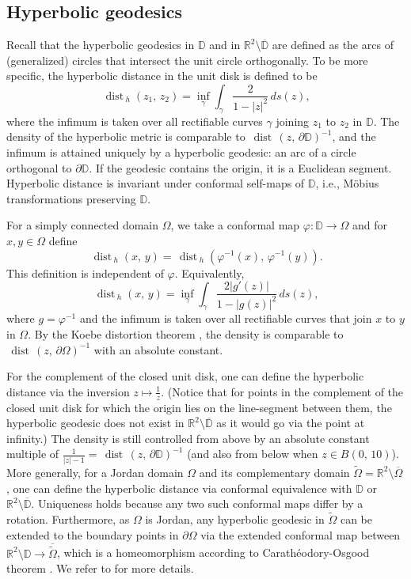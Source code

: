 \documentclass[reqno,11pt]{amsart}
\def\dist{{\mathop\mathrm{\,dist\,}}}
\def\wz{\widetilde}
\numberwithin{equation}{section}
\theoremstyle{remark}
\begin{document}
\subsection{Hyperbolic geodesics}

Recall that the hyperbolic geodesics in $\mathbb D$ and in
$\mathbb R^2\setminus \overline{\mathbb D}$ are defined as the arcs of 
(generalized) circles that intersect the 
unit circle orthogonally. 
  To be more specific, the hyperbolic distance in the unit disk
is defined to be
$$\dist_h(z_1,\,z_2)=\inf_{\gamma}\int_{\gamma} \frac {2}{1-|z|^2}\, d s(z),$$
where the infimum is taken over all rectifiable curves $\gamma$ joining $z_1$ to $z_2$ in $\mathbb D$. The density of the hyperbolic metric is comparable to $\dist(z,\,\partial \mathbb D)^{-1}$, and the infimum is attained uniquely by a hyperbolic geodesic: an arc of a circle orthogonal to $\partial \mathbb D$. If the geodesic contains the origin, it is a Euclidean segment. Hyperbolic distance is invariant under conformal self-maps of $\mathbb D$, i.e., M\"obius transformations preserving $\mathbb D$. 

For a simply connected domain $\Omega$, we take a conformal map $\varphi\colon \mathbb D\to \Omega$ and for $x, y \in \Omega$ define 
$$\dist_{h}(x,\,y)=\dist_h(\varphi^{-1}(x),\,\varphi^{-1}(y)) .$$
This definition is independent of $\varphi$. %
Equivalently, 
$$\dist_h(x,\,y)=\inf_{\gamma}\int_{\gamma} \frac {2|g'(z)|}{1-|g(z)|^2}\, d s(z),$$
where $g=\varphi^{-1}$ and the infimum is taken over all rectifiable curves that join $x$ to $y$ in $\Omega.$ 
By the Koebe distortion  theorem \cite[Theorem 2.10.6]{AIM2009}, the density is comparable to $\dist(z,\,\partial \Omega)^{-1}$ with an absolute constant. 

For the complement of the closed unit disk, one can define the hyperbolic distance via the inversion $z\mapsto \frac{1}{z}$.
(Notice that for points in the complement of the closed unit disk for which the origin lies on the line-segment between them, the hyperbolic geodesic does not exist in $\mathbb R^2 \setminus \overline{\mathbb D}$ as it would go via the point at infinity.)
The density is still controlled from above by an absolute constant multiple of $\frac 1 {|z|-1}=\dist(z,\,\partial \mathbb D)^{-1}$ (and also from below when $z\in B(0,\,10)$). 
More generally, for a Jordan domain $\Omega$ and its complementary domain $\wz \Omega=\mathbb R^2\setminus \overline{\Omega}$, one can define the hyperbolic distance via conformal equivalence with $\mathbb D$ or  $\mathbb R^2\setminus \overline{\mathbb D}$. Uniqueness holds because any two such conformal maps differ by a rotation. Furthermore, as $\Omega$ is Jordan, any hyperbolic geodesic in $\wz \Omega$ can be extended to the boundary points in $\partial \Omega$ via the extended conformal map between $\mathbb R^2\setminus {\mathbb D}  \to \overline{\wz \Omega}$, which is a homeomorphism  according to Carath\'eodory-Osgood  theorem  \cite[Section IX.4]{P1991}.
We refer to \cite[Chapter 2]{AIM2009} for more details.
 
\end{document}
